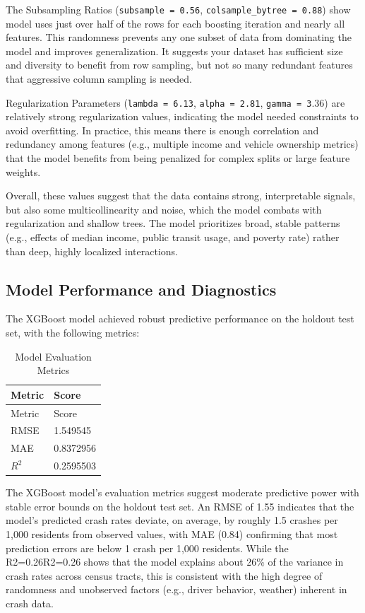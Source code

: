 \documentclass[
  number,
  review,
  3p]{elsarticle}
\begin{document}
The Subsampling Ratios (\texttt{subsample\ =\ 0.56},
\texttt{colsample\_bytree\ =\ 0.88}) show model uses just over half of
the rows for each boosting iteration and nearly all features. This
randomness prevents any one subset of data from dominating the model and
improves generalization. It suggests your dataset has sufficient size
and diversity to benefit from row sampling, but not so many redundant
features that aggressive column sampling is needed.

Regularization Parameters (\texttt{lambda\ =\ 6.13},
\texttt{alpha\ =\ 2.81}, \texttt{gamma\ =\ 3}.36) are relatively strong
regularization values, indicating the model needed constraints to avoid
overfitting. In practice, this means there is enough correlation and
redundancy among features (e.g., multiple income and vehicle ownership
metrics) that the model benefits from being penalized for complex splits
or large feature weights.

Overall, these values suggest that the data contains strong,
interpretable signals, but also some multicollinearity and noise, which
the model combats with regularization and shallow trees. The model
prioritizes broad, stable patterns (e.g., effects of median income,
public transit usage, and poverty rate) rather than deep, highly
localized interactions.

\subsection{\texorpdfstring{\textbf{Model Performance and
Diagnostics}}{Model Performance and Diagnostics}}\label{model-performance-and-diagnostics}

The XGBoost model achieved robust predictive performance on the holdout
test set, with the following metrics:\\

\begin{longtable}[]{@{}ll@{}}
\caption{Model Evaluation Metrics}\tabularnewline
\toprule\noalign{}
Metric & Score \\
\midrule\noalign{}
\endfirsthead
\toprule\noalign{}
Metric & Score \\
\midrule\noalign{}
\endhead
\bottomrule\noalign{}
\endlastfoot
RMSE & 1.549545 \\
MAE & 0.8372956 \\
\(R^2\) & 0.2595503 \\
\end{longtable}

The XGBoost model's evaluation metrics suggest moderate predictive power
with stable error bounds on the holdout test set. An RMSE of 1.55
indicates that the model's predicted crash rates deviate, on average, by
roughly 1.5 crashes per 1,000 residents from observed values, with MAE
(0.84) confirming that most prediction errors are below 1 crash per
1,000 residents. While the R2=0.26R2=0.26 shows that the model explains
about 26\% of the variance in crash rates across census tracts, this is
consistent with the high degree of randomness and unobserved factors
(e.g., driver behavior, weather) inherent in crash data.
\end{document}
